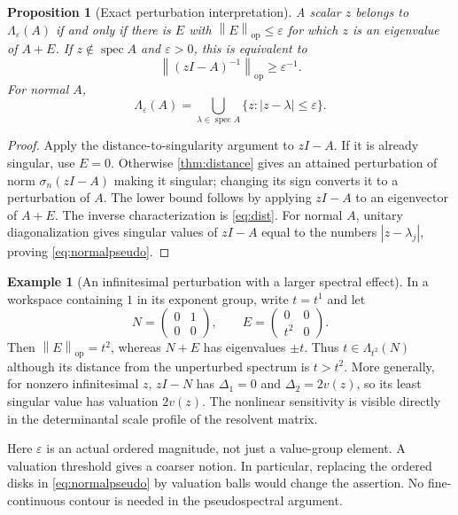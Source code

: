 \documentclass[11pt,a4paper]{article}
\numberwithin{equation}{section}
\newtheorem{proposition}[proposition]{Proposition}
\theoremstyle{definition}
\newtheorem{example}[example]{Example}
\theoremstyle{remark}
\newcommand{\spec}{\operatorname{spec}}
\newcommand{\op}{\mathrm{op}}
\newcommand{\norm}[1]{\left\lVert#1\right\rVert}
\begin{document}
\begin{proposition}[Exact perturbation interpretation]\label{prop:pseudo}
A scalar $z$ belongs to $\Lambda_\varepsilon(A)$ if and only if there is
$E$ with $\norm E_{\op}\le\varepsilon$ for which $z$ is an eigenvalue of
$A+E$. If $z\notin\spec A$ and $\varepsilon>0$, this is equivalent to
\[
 \norm{(zI-A)^{-1}}_{\op}\ge\varepsilon^{-1}.
\]
For normal $A$,
\begin{equation}\label{eq:normalpseudo}
 \Lambda_\varepsilon(A)=
   \bigcup_{\lambda\in\spec A}\{z:|z-\lambda|\le\varepsilon\}.
\end{equation}
\end{proposition}
\begin{proof}
Apply the distance-to-singularity argument to $zI-A$. If it is already
singular, use $E=0$. Otherwise \cref{thm:distance} gives an attained
perturbation of norm $\sigma_n(zI-A)$ making it singular; changing its
sign converts it to a perturbation of $A$. The lower bound follows by
applying $zI-A$ to an eigenvector of $A+E$. The inverse characterization is
\eqref{eq:dist}. For normal $A$, unitary diagonalization gives singular
values of $zI-A$ equal to the numbers $|z-\lambda_j|$, proving
\eqref{eq:normalpseudo}.
\end{proof}

\begin{example}[An infinitesimal perturbation with a larger spectral effect]
In a workspace containing $1$ in its exponent group, write $t=t^1$ and let
\[
 N=\begin{pmatrix}0&1\\0&0\end{pmatrix},\qquad
 E=\begin{pmatrix}0&0\\t^2&0\end{pmatrix}.
\]
Then $\norm E_{\op}=t^2$, whereas $N+E$ has eigenvalues $\pm t$.
Thus $t\in\Lambda_{t^2}(N)$ although its distance from the unperturbed
spectrum is $t>t^2$. More generally, for nonzero infinitesimal $z$,
$zI-N$ has $\Delta_1=0$ and $\Delta_2=2v(z)$, so its least singular
value has valuation $2v(z)$. The nonlinear sensitivity is visible directly
in the determinantal scale profile of the resolvent matrix.
\end{example}

Here $\varepsilon$ is an actual ordered magnitude, not just a value-group
element. A valuation threshold gives a coarser notion. In particular,
replacing the ordered disks in \eqref{eq:normalpseudo} by valuation balls
would change the assertion. No fine-continuous contour is needed in the
pseudospectral argument.
\end{document}
